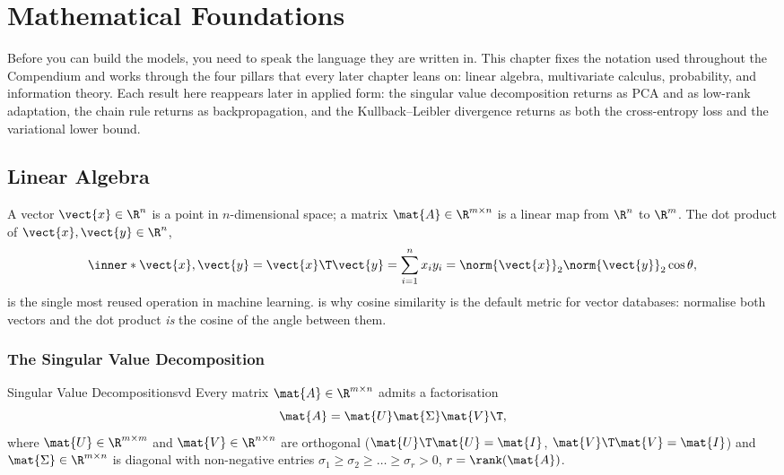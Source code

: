 \chapter{Mathematical Foundations}
\label{ch:math-foundations}

Before you can build the models, you need to speak the language they are written
in. This chapter fixes the notation used throughout the Compendium and works
through the four pillars that every later chapter leans on: linear algebra,
multivariate calculus, probability, and information theory. Each result here
reappears later in applied form: the singular value decomposition returns as
PCA and as low-rank adaptation, the chain rule returns as backpropagation, and
the Kullback--Leibler divergence returns as both the cross-entropy loss and the
variational lower bound.

\section{Linear Algebra}
\label{sec:linear-algebra}

A vector $\vect{x} \in \R^{n}$ is a point in $n$-dimensional space; a matrix
$\mat{A} \in \R^{m \times n}$ is a linear map from $\R^{n}$ to $\R^{m}$. The
dot product of $\vect{x}, \vect{y} \in \R^{n}$,
%
\begin{equation}
    \inner*{\vect{x}, \vect{y}} = \vect{x}\T \vect{y}
        = \sum_{i=1}^{n} x_i y_i
        = \norm{\vect{x}}_2 \norm{\vect{y}}_2 \cos\theta ,
    \label{eq:dot-product}
\end{equation}
%
is the single most reused operation in machine learning. 
is why cosine similarity is the default metric for vector databases: normalise
both vectors and the dot product \emph{is} the cosine of the angle between them.

\subsection{The Singular Value Decomposition}

\begin{theorem}{Singular Value Decomposition}{svd}
    Every matrix $\mat{A} \in \R^{m \times n}$ admits a factorisation
    \begin{equation}
        \mat{A} = \mat{U} \mat{\Sigma} \mat{V}\T ,
        \label{eq:svd}
    \end{equation}
    where $\mat{U} \in \R^{m \times m}$ and $\mat{V} \in \R^{n \times n}$ are
    orthogonal ($\mat{U}\T\mat{U} = \mat{I}$, $\mat{V}\T\mat{V} = \mat{I}$) and
    $\mat{\Sigma} \in \R^{m \times n}$ is diagonal with non-negative entries
    $\sigma_1 \ge \sigma_2 \ge \dots \ge \sigma_r > 0$, $r = \rank(\mat{A})$.
\end{theorem}


